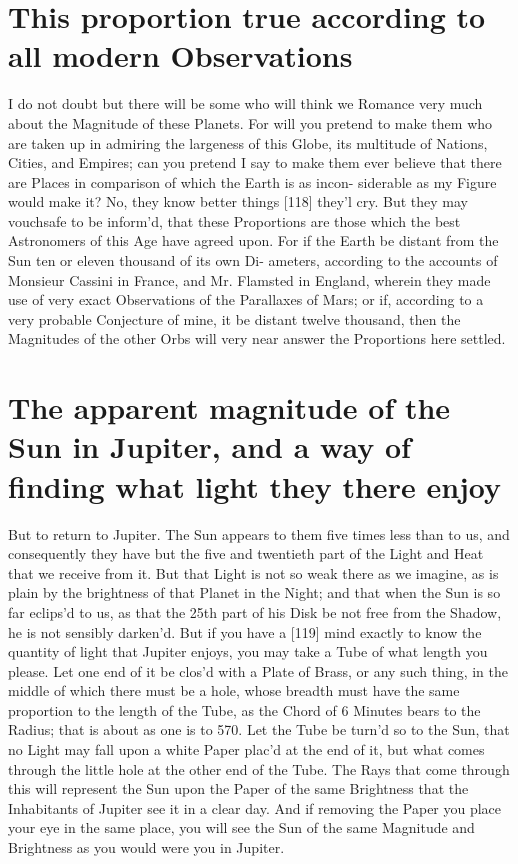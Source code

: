 \documentclass[letterpaper]{book}
\begin{document}
\section{This proportion true according to all modern Observations}

I do not doubt but there will be some who will think we Romance very
much about the Magnitude of these Planets. For will you pretend to make
them who are taken up in admiring the largeness of this Globe, its multitude
of Nations, Cities, and Empires; can you pretend I say to make them ever
believe that there are Places in comparison of which the Earth is as incon-
siderable as my Figure would make it? No, they know better things [118]
they'l cry. But they may vouchsafe to be inform'd, that these Proportions
are those which the best Astronomers of this Age have agreed upon. For
if the Earth be distant from the Sun ten or eleven thousand of its own Di-
ameters, according to the accounts of Monsieur Cassini in France, and Mr.
Flamsted in England, wherein they made use of very exact Observations of
the Parallaxes of Mars; or if, according to a very probable Conjecture of
mine, it be distant twelve thousand, then the Magnitudes of the other Orbs
will very near answer the Proportions here settled.


\section{The apparent magnitude of the Sun in Jupiter, and a way of finding
what light they there enjoy}

But to return to Jupiter. The Sun appears to them five times less than to
us, and consequently they have but the five and twentieth part of the Light
and Heat that we receive from it. But that Light is not so weak there as we
imagine, as is plain by the brightness of that Planet in the Night; and that
when the Sun is so far eclips'd to us, as that the 25th part of his Disk be
not free from the Shadow, he is not sensibly darken'd. But if you have a
[119] mind exactly to know the quantity of light that Jupiter enjoys, you
may take a Tube of what length you please. Let one end of it be clos'd with a
Plate of Brass, or any such thing, in the middle of which there must be a
hole, whose breadth must have the same proportion to the length of the Tube,
as the Chord of 6 Minutes bears to the Radius; that is about as one is to
570.  Let the Tube be turn'd so to the Sun, that no Light may fall upon a
white Paper plac'd at the end of it, but what comes through the little hole
at the other end of the Tube. The Rays that come through this will represent
the Sun upon the Paper of the same Brightness that the Inhabitants of
Jupiter see it in a clear day. And if removing the Paper you place your eye
in the same place, you will see the Sun of the same Magnitude and Brightness
as you would were you in Jupiter.
\end{document}
